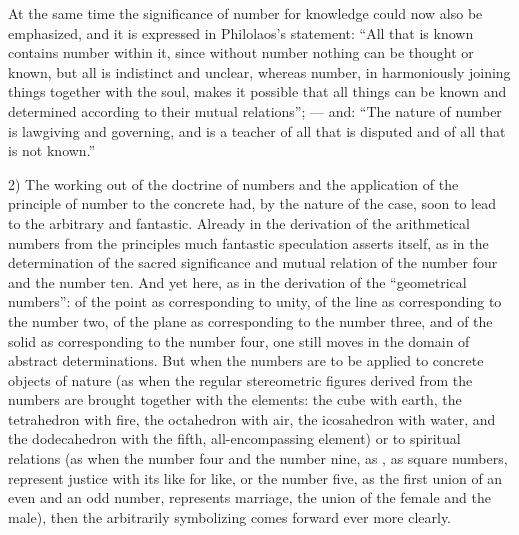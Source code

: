 At the same time the significance of number for knowledge could now
also be emphasized, and it is expressed in Philolaos's statement: ``All
that is known contains number within it, since without number
nothing can be thought or known, but all is indistinct and unclear,
whereas number, in harmoniously joining things together with the soul,
makes it possible that all things can be known and determined according
to their mutual relations''; --- and: ``The nature of number is
lawgiving and governing, and is a teacher of all that is disputed and
of all that is not known.''

2) The working out of the doctrine of numbers and the application of
the principle of number to the concrete had, by the nature of the
case, soon to lead to the arbitrary and fantastic. Already in the
derivation of the arithmetical numbers from the principles much
fantastic speculation asserts itself, as in the determination of the
sacred significance and mutual relation of the number four and the
number ten. And yet here, as in the derivation of the ``geometrical
numbers'': of the point as corresponding to unity, of the line as
corresponding to the number two, of the plane as corresponding to the
number three, and of the solid as corresponding to the number four,
one still moves in the domain of abstract determinations. But when the
numbers are to be applied to concrete objects of nature (as when the
regular stereometric figures derived from the numbers are brought
together with the elements: the cube with earth, the tetrahedron with
fire, the octahedron with air, the icosahedron with water, and the
dodecahedron with the fifth, all-encompassing element) or to spiritual
relations (as when the number four and the number nine, as ,
as square numbers, represent justice with its like for like, or the
number five, as the first union of an even and an odd number,
represents marriage, the union of the female and the male), then the
arbitrarily symbolizing comes forward ever more clearly.

